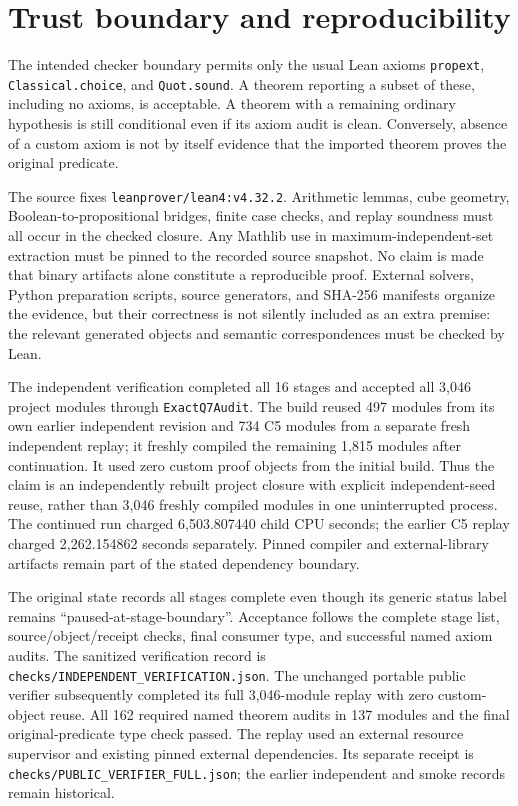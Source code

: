 \documentclass[11pt]{article}
\theoremstyle{definition}\newtheorem{definition}[theorem]{Definition}
\theoremstyle{remark}\newtheorem{remark}[theorem]{Remark}
\newcommand{\src}[1]{{\small\nolinkurl{#1}}}
\begin{document}
\section{Trust boundary and reproducibility}
The intended checker boundary permits only the usual Lean axioms \src{propext}, \src{Classical.choice}, and \src{Quot.sound}. A theorem reporting a subset of these, including no axioms, is acceptable. A theorem with a remaining ordinary hypothesis is still conditional even if its axiom audit is clean. Conversely, absence of a custom axiom is not by itself evidence that the imported theorem proves the original predicate.

The source fixes \src{leanprover/lean4:v4.32.2}. Arithmetic lemmas, cube geometry, Boolean-to-propositional bridges, finite case checks, and replay soundness must all occur in the checked closure. Any Mathlib use in maximum-independent-set extraction must be pinned to the recorded source snapshot. No claim is made that binary artifacts alone constitute a reproducible proof. External solvers, Python preparation scripts, source generators, and SHA-256 manifests organize the evidence, but their correctness is not silently included as an extra premise: the relevant generated objects and semantic correspondences must be checked by Lean.

The independent verification completed all 16 stages and accepted all 3,046 project modules through \src{ExactQ7Audit}. The build reused 497 modules from its own earlier independent revision and 734 C5 modules from a separate fresh independent replay; it freshly compiled the remaining 1,815 modules after continuation. It used zero custom proof objects from the initial build. Thus the claim is an independently rebuilt project closure with explicit independent-seed reuse, rather than 3,046 freshly compiled modules in one uninterrupted process. The continued run charged 6,503.807440 child CPU seconds; the earlier C5 replay charged 2,262.154862 seconds separately. Pinned compiler and external-library artifacts remain part of the stated dependency boundary.

The original state records all stages complete even though its generic status label remains ``paused-at-stage-boundary''. Acceptance follows the complete stage list, source/object/receipt checks, final consumer type, and successful named axiom audits. The sanitized verification record is \src{checks/INDEPENDENT_VERIFICATION.json}. The unchanged portable public verifier subsequently completed its full 3,046-module replay with zero custom-object reuse. All 162 required named theorem audits in 137 modules and the final original-predicate type check passed. The replay used an external resource supervisor and existing pinned external dependencies. Its separate receipt is \src{checks/PUBLIC_VERIFIER_FULL.json}; the earlier independent and smoke records remain historical.
\end{document}
